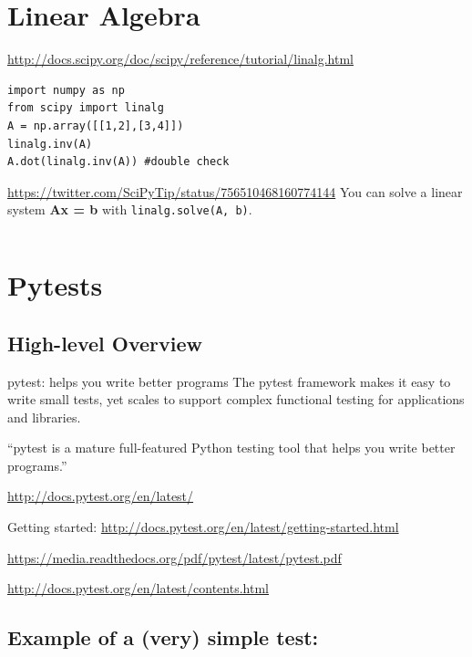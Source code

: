 \documentclass[11pt,a4paper]{article}
\begin{document}
\newpage
\section{Linear Algebra}
\href{http://docs.scipy.org/doc/scipy/reference/tutorial/linalg.html}{http://docs.scipy.org/doc/scipy/reference/tutorial/linalg.html}

\begin{lstlisting}
import numpy as np
from scipy import linalg
A = np.array([[1,2],[3,4]])
linalg.inv(A)
A.dot(linalg.inv(A)) #double check
\end{lstlisting}

\noindent
\href{https://twitter.com/SciPyTip/status/756510468160774144}{https://twitter.com/SciPyTip/status/756510468160774144}
You can solve a linear system {\bf Ax = b} with {\tt linalg.solve(A, b)}.
\begin{lstlisting}

\end{lstlisting}





\newpage
\section{Pytests}
\subsection{High-level Overview}
pytest: helps you write better programs
The pytest framework makes it easy to write small tests, yet scales to support complex functional testing for applications and libraries.

``pytest is a mature full-featured Python testing tool that helps you write better programs.''

\href{http://docs.pytest.org/en/latest/}{http://docs.pytest.org/en/latest/}

Getting started: \href{http://docs.pytest.org/en/latest/getting-started.html}{http://docs.pytest.org/en/latest/getting-started.html}

\href{pytest Documentation (Release 3.0.2.dev)}{https://media.readthedocs.org/pdf/pytest/latest/pytest.pdf}

\href{http://docs.pytest.org/en/latest/contents.html}{http://docs.pytest.org/en/latest/contents.html}

\subsection{Example of a (very) simple test:}
\end{document}
